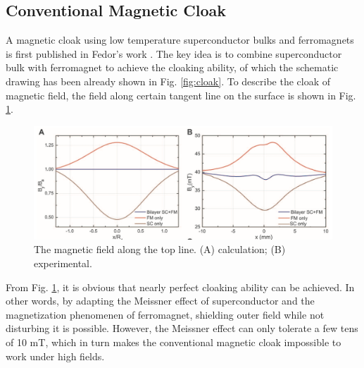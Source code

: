 \subsection{Conventional Magnetic Cloak}
A magnetic cloak using low temperature superconductor bulks and ferromagnets is first published in Fedor's work \cite{2_20}.
The key idea is to combine superconductor bulk with ferromagnet to achieve the cloaking ability,
of which the schematic drawing has been already shown in Fig. \ref{fig:cloak}.
To describe the cloak of magnetic field, the field along certain tangent line on the surface is shown in Fig. \ref{fig:cloakSurfaceLine}.
\begin{figure}[H]
  \includegraphics[width=17cm, bb=9 9 900 550]{./section2Proposal/cloakSurfaceLine.png}
  \caption{The magnetic field along the top line. (A) calculation; (B) experimental.\cite{2_20}}
  \label{fig:cloakSurfaceLine}
\end{figure}
From Fig. \ref{fig:cloakSurfaceLine}, it is obvious that nearly perfect cloaking ability can be achieved.
In other words, by adapting the Meissner effect of superconductor and the magnetization phenomenen of ferromagnet,
shielding outer field while not disturbing it is possible.
However, the Meissner effect can only tolerate a few tens of 10 mT, which in turn makes the conventional magnetic cloak impossible to work under high fields.


